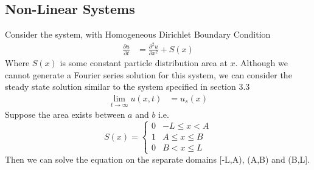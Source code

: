\documentclass{article}
\begin{document}
\subsection{Non-Linear Systems}
Consider the system, with Homogeneous Dirichlet Boundary Condition
\[
	\begin{split}
		\frac{\partial u}{\partial t} &= \frac{\partial^2 u}{\partial x^2} + S(x)
	\end{split}
\]
Where $S(x)$ is some constant particle distribution area at $x$.
Although we cannot generate a Fourier series solution for this system, we can consider the steady state solution similar to the system specified in section 3.3
\[
	\begin{split}
		\lim_{t\rightarrow\infty}u(x,t)&=u_s(x)
	\end{split}
\]
Suppose the area exists between $a$ and $b$ i.e.
\[ 
	S(x) = \begin{cases} 
      0 & -L \leq x < A \\
      1 & A\leq x\leq B \\
      0 & B < x \leq L
   \end{cases}
\]
Then we can solve the equation on the separate domains [-L,A), (A,B) and (B,L].
\end{document}
